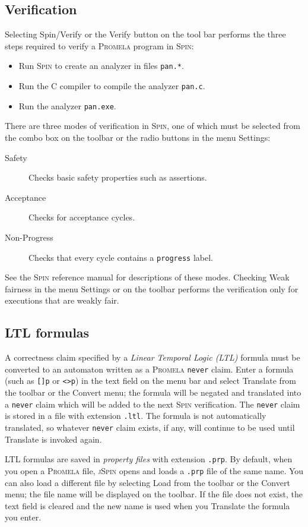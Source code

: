 \documentclass[11pt]{article}
\newcommand{\spn}{\textsc{Spin}}
\newcommand{\prm}{\textsc{Promela}}
\newcommand{\js}{\textsc{jSpin}}
\newcommand{\p}[1]{\texttt{#1}}
\newcommand{\bu}[1]{\textsf{#1}}
\begin{document}
\subsection{Verification}
Selecting \bu{Spin/Verify} or the \bu{Verify} button on the tool bar
performs the three steps required to verify a \prm{} program in \spn{}:
\begin{itemize}
\item Run \spn{} to create an analyzer in files \p{pan.*}.
\item Run the C compiler to compile the analyzer \p{pan.c}.
\item Run the analyzer \p{pan.exe}.
\end{itemize}
There are three modes of verification in \spn{},
one of which must be selected from the combo box on the toolbar
or the radio buttons in the menu \bu{Settings}:
\begin{description}
\item[Safety] Checks basic safety properties such as assertions.
\item[Acceptance] Checks for acceptance cycles.
\item[Non-Progress] Checks that every cycle contains a
\p{progress} label.
\end{description}
See the \spn{} reference manual for descriptions of these modes.
Checking \bu{Weak fairness} in the menu \bu{Settings}
or on the toolbar performs the verification only for executions that are
weakly fair.

\subsection{LTL formulas}
A correctness claim specified by a \emph{Linear Temporal Logic (LTL)} formula
must be converted to an automaton written as a \prm{} \p{never} claim.
Enter a formula (such as \p{[]p} or \p{<>p}) in the text field on the menu
bar and select \bu{Translate} from the toolbar or the \bu{Convert} menu;
the formula will be negated and translated into a \p{never}
claim which will be added to the next \spn{} verification.
The \p{never} claim is stored in a file with extension \p{.ltl}.
The formula is not automatically translated, so whatever \p{never}
claim exists, if any, will continue to be used until \bu{Translate} is invoked again.

LTL formulas are saved in \emph{property files} with extension \p{.prp}.
By default, when you open a \prm{} file,
\js{} opens and loads a \p{.prp} file of the same name.
You can also load a different file by selecting \bu{Load} from
the toolbar or the \bu{Convert} menu;
the file name will be displayed on the toolbar.
If the file does not exist,
the text field is cleared and the new name is used when you \bu{Translate} the formula
you enter.
\end{document}
